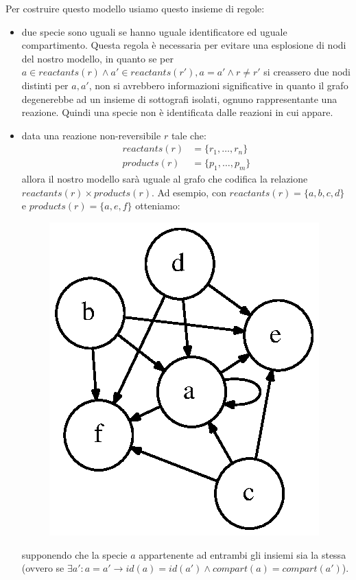 Per costruire questo modello usiamo questo insieme di regole:
\begin{itemize}
\item due specie sono uguali se hanno uguale identificatore ed uguale
  compartimento. Questa regola \`e necessaria per evitare una
  esplosione di nodi del nostro modello, in quanto se per $a \in
  reactants(r) \wedge a' \in reactants(r'), a = a' \wedge r \not = r'$
  si creassero due nodi distinti per $a, a'$, non si avrebbero
  informazioni significative in quanto il grafo degenerebbe ad un
  insieme di sottografi isolati, ognuno rappresentante una
  reazione. Quindi una specie non \`e identificata dalle reazioni in
  cui appare.
\item data una reazione non-reversibile $r$ tale che:
  \begin{displaymath}
    \begin{split} 
      reactants(r) &= \{ r_{1}, \ldots, r_{n} \} \\
      products(r) &= \{ p_{1}, \ldots, p_{m} \}
    \end{split}
  \end{displaymath}
  allora il nostro modello sar\`a uguale al grafo che codifica la
  relazione $reactants(r) \times products(r)$. Ad esempio, con
  $reactants(r) = \{ a, b, c, d \}$ e $products(r) = \{a, e, f\}$
  otteniamo:

\begin{figure}[!htb]
\centering
\includegraphics{images/non-reversible-reaction-example.dot.eps}
\end{figure}
supponendo che la specie $a$ appartenente ad entrambi gli
insiemi sia la stessa (ovvero se $\exists a': a = a' \rightarrow id(a) =
id(a') \wedge compart(a) = compart(a')$).


\end{itemize}
